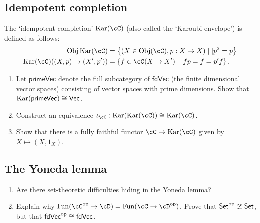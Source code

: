 \documentclass[12pt]{amsart}
\begin{document}
\subsection{Idempotent completion}
The `idempotent completion' $\Kar(\cC)$ (also called the `Karoubi envelope') is defined as follows:
\begin{align*}
\Obj \Kar(\cC) & = \left\{ (X \in \Obj(\cC), p :  X \to X) \mid| p^2 = p \right\} \\
\Kar(\cC)((X,p) \to (X',p')) & = \left\{ f \in \cC(X \to X') \mid| fp = f = p'f \right\}.
\end{align*}
\begin{enumerate}
\item Let $\mathsf{primeVec}$ denote the full subcategory of $\mathsf{fdVec}$ (the finite dimensional vector spaces) consisting of vector spaces with prime dimensions. Show that $\operatorname{Kar}(\mathsf{primeVec}) \cong \mathsf{Vec}$.
\item Construct an equivalence $\iota_\cC : \Kar(\Kar(\cC)) \cong \Kar(\cC)$.
\item Show that there is a fully faithful functor $\cC \to \Kar(\cC)$ given by $X \mapsto (X, 1_X)$.
\end{enumerate}

\subsection{The Yoneda lemma}
\begin{enumerate}
\item Are there set-theoretic difficulties hiding in the Yoneda lemma?
\item Explain why $\Fun(\cC^\text{op} \to \cD) = \Fun(\cC \to \cD^\text{op})$. Prove that $\mathsf{Set}^\text{op} \ncong \mathsf{Set}$, but that $\mathsf{fdVec}^\text{op} \cong \mathsf{fdVec}$.
\end{enumerate}

\newpage
\end{document}
